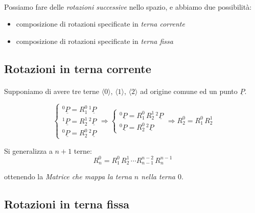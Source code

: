 \paragraph{}
Possiamo fare delle \emph{rotazioni successive} nello spazio, e abbiamo due possibilità: 
\begin{itemize}
	\item composizione di rotazioni specificate in \emph{terna corrente}
	\item composizione di rotazioni specificate in \emph{terna fissa}
\end{itemize}

\subsection{Rotazioni in terna corrente}
\paragraph{}
Supponiamo di avere tre terne $\langle0\rangle$, $\langle1\rangle$, $\langle2\rangle$ ad origine comune ed un punto $\underline{P}$.

\begin{equation*}
	\begin{cases}
		^0\underline{P} = R_1^0 \, ^1\underline{P} \\
		^1\underline{P} = R_2^1 \, ^2\underline{P} \\
		^0\underline{P} = R_2^0 \, ^2\underline{P}
	\end{cases}
	\Rightarrow
	\begin{cases}
		^0\underline{P} = R_1^0 \, R_2^1 \, ^2\underline{P} \\
		^0\underline{P} = R_2^0 \, ^2\underline{P}
	\end{cases}
	\Rightarrow
	R_2^0 = R_1^0 \, R_2^1
\end{equation*}

Si generalizza a $n+1$ terne:  
\begin{equation}
	R_n^0 = R_1^0 \, R_2^1 \, \cdots R_{n-1}^{n-2} \, R_{n}^{n-1}
\end{equation}

ottenendo la \emph{Matrice che mappa la terna $n$ nella terna $0$}.
\newpage

\subsection{Rotazioni in terna fissa}
